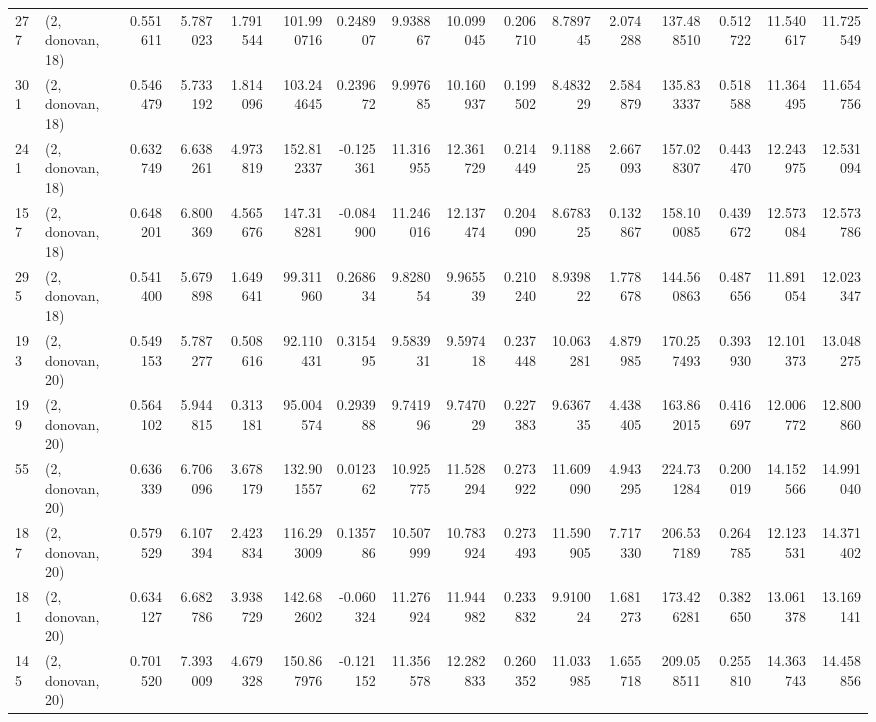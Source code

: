 \begin{tabular}{llrrrrrrrrrrrrrr}
277 &  (2, donovan, 18) &   0.551611 &   5.787023 &   1.791544 &   101.990716 &   0.248907 &   9.938867 &  10.099045 &  0.206710 &   8.789745 &   2.074288 &   137.488510 &  0.512722 &  11.540617 &  11.725549 \\
301 &  (2, donovan, 18) &   0.546479 &   5.733192 &   1.814096 &   103.244645 &   0.239672 &   9.997685 &  10.160937 &  0.199502 &   8.483229 &   2.584879 &   135.833337 &  0.518588 &  11.364495 &  11.654756 \\
241 &  (2, donovan, 18) &   0.632749 &   6.638261 &   4.973819 &   152.812337 &  -0.125361 &  11.316955 &  12.361729 &  0.214449 &   9.118825 &   2.667093 &   157.028307 &  0.443470 &  12.243975 &  12.531094 \\
157 &  (2, donovan, 18) &   0.648201 &   6.800369 &   4.565676 &   147.318281 &  -0.084900 &  11.246016 &  12.137474 &  0.204090 &   8.678325 &   0.132867 &   158.100085 &  0.439672 &  12.573084 &  12.573786 \\
295 &  (2, donovan, 18) &   0.541400 &   5.679898 &   1.649641 &    99.311960 &   0.268634 &   9.828054 &   9.965539 &  0.210240 &   8.939822 &   1.778678 &   144.560863 &  0.487656 &  11.891054 &  12.023347 \\
193 &  (2, donovan, 20) &   0.549153 &   5.787277 &   0.508616 &    92.110431 &   0.315495 &   9.583931 &   9.597418 &  0.237448 &  10.063281 &   4.879985 &   170.257493 &  0.393930 &  12.101373 &  13.048275 \\
199 &  (2, donovan, 20) &   0.564102 &   5.944815 &   0.313181 &    95.004574 &   0.293988 &   9.741996 &   9.747029 &  0.227383 &   9.636735 &   4.438405 &   163.862015 &  0.416697 &  12.006772 &  12.800860 \\
55  &  (2, donovan, 20) &   0.636339 &   6.706096 &   3.678179 &   132.901557 &   0.012362 &  10.925775 &  11.528294 &  0.273922 &  11.609090 &   4.943295 &   224.731284 &  0.200019 &  14.152566 &  14.991040 \\
187 &  (2, donovan, 20) &   0.579529 &   6.107394 &   2.423834 &   116.293009 &   0.135786 &  10.507999 &  10.783924 &  0.273493 &  11.590905 &   7.717330 &   206.537189 &  0.264785 &  12.123531 &  14.371402 \\
181 &  (2, donovan, 20) &   0.634127 &   6.682786 &   3.938729 &   142.682602 &  -0.060324 &  11.276924 &  11.944982 &  0.233832 &   9.910024 &   1.681273 &   173.426281 &  0.382650 &  13.061378 &  13.169141 \\
145 &  (2, donovan, 20) &   0.701520 &   7.393009 &   4.679328 &   150.867976 &  -0.121152 &  11.356578 &  12.282833 &  0.260352 &  11.033985 &   1.655718 &   209.058511 &  0.255810 &  14.363743 &  14.458856 \\

\end{tabular}
